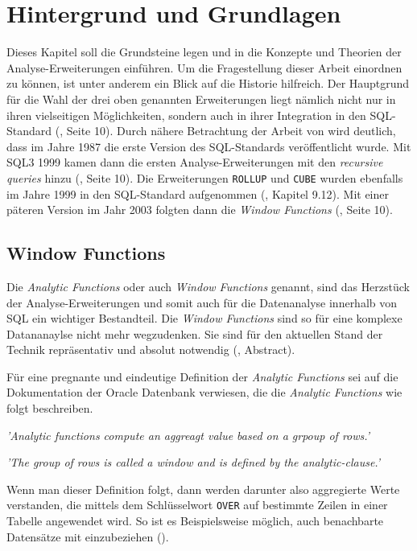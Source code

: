 \chapter{Hintergrund und Grundlagen}
Dieses Kapitel soll die Grundsteine legen und in die Konzepte und Theorien der Analyse-Erweiterungen
einführen. Um die Fragestellung dieser Arbeit einordnen zu können, ist unter anderem
ein Blick auf die Historie hilfreich. Der Hauptgrund für die Wahl der drei oben
genannten Erweiterungen liegt nämlich nicht nur in ihren vielseitigen
Möglichkeiten, sondern auch in ihrer Integration in den SQL-Standard (\cite{grust2017advanced},
Seite 10). Durch nähere Betrachtung der Arbeit von \cite{grust2017advanced} wird
deutlich, dass im Jahre 1987 die erste Version des SQL-Standards veröffentlicht
wurde. Mit SQL3 1999 kamen dann die ersten Analyse-Erweiterungen mit den \textit{recursive
queries} hinzu (\cite{grust2017advanced}, Seite 10). Die Erweiterungen \texttt{ROLLUP}
und \texttt{CUBE} wurden ebenfalls im Jahre 1999 in den SQL-Standard aufgenommen
(\cite{melton2001sql}, Kapitel 9.12). Mit einer päteren Version im Jahr 2003
folgten dann die \textit{Window Functions} (\cite{grust2017advanced}, Seite 10).

\section{Window Functions}
Die \textit{Analytic Functions} oder auch \textit{Window Functions} genannt, sind
das Herzstück der Analyse-Erweiterungen und somit auch für die Datenanalyse innerhalb
von SQL ein wichtiger Bestandteil. Die \textit{Window Functions} sind so für eine
komplexe Datananaylse nicht mehr wegzudenken. Sie sind für den aktuellen Stand
der Technik repräsentativ und absolut notwendig (\cite{cao2012optimization},
Abstract).

Für eine pregnante und eindeutige Definition der \textit{Analytic Functions} sei
auf die Dokumentation der Oracle Datenbank verwiesen, die die \textit{Analytic
Functions} wie folgt beschreiben.
\begin{center}
	\textit{ 'Analytic functions compute an aggreagt value based on a grpoup of
	rows.' } \\ \cite{oracle}

	\textit{ 'The group of rows is called a window and is defined by the analytic-clause.'
	} \\ \cite{oracle}
\end{center}
Wenn man dieser Definition folgt, dann werden darunter also aggregierte Werte
verstanden, die mittels dem Schlüsselwort \texttt{OVER} auf bestimmte Zeilen in
einer Tabelle angewendet wird. So ist es Beispielsweise möglich, auch
benachbarte Datensätze mit einzubeziehen (\cite{oracle}).

